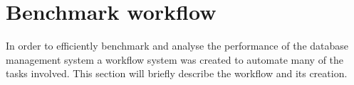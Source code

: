 \section{Benchmark workflow}\label{sec:benchmark:workflow}
In order to efficiently benchmark and analyse the performance of the database
management system a workflow system was created to automate many of the tasks
involved. This section will briefly describe the workflow and its creation.
